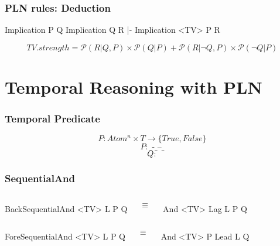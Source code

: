 \documentclass[aspectratio=169]{beamer}
\begin{document}
\begin{frame}[fragile]

  \frametitle{PLN rules: Deduction}
\begin{semiverbatim}
Implication
  P
  Q
Implication
  Q
  R
|-
Implication <TV>
  P
  R
\end{semiverbatim}
$$TV.strength = \mathcal{P}(R|Q,P)\times\mathcal{P}(Q|P) + \mathcal{P}(R|¬Q,P)\times\mathcal{P}(¬Q|P)$$
\end{frame}

\section {Temporal Reasoning with PLN}

\begin{frame}
  \frametitle{Temporal Predicate}
  $$P: Atom^n \times T \rightarrow \{True, False\}$$
  $$P: \texttt{\_-\_--\_}$$
  $$Q: $$
\end{frame}

\begin{frame}[fragile]
  \frametitle{SequentialAnd}

  \begin{columns}
    \column{1in}
\begin{semiverbatim}
BackSequentialAnd <TV>
  L
  P
  Q
\end{semiverbatim}

    \column{0.5in}
    $$\equiv$$

    \column{1in}
\begin{semiverbatim}
And <TV>
  Lag
    L
    P
  Q
\end{semiverbatim}

  \end{columns}

    \begin{columns}
    \column{1in}
\begin{semiverbatim}
ForeSequentialAnd <TV>
  L
  P
  Q
\end{semiverbatim}

    \column{0.5in}
    $$\equiv$$

    \column{1in}
\begin{semiverbatim}
And <TV>
  P
  Lead
    L
    Q
\end{semiverbatim}

  \end{columns}

\end{frame}
\end{document}
